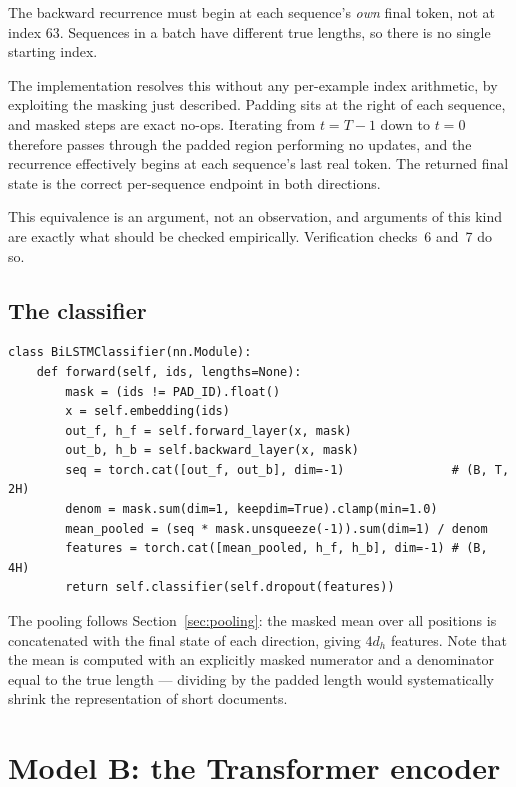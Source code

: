  The backward recurrence must begin
at each sequence's \emph{own} final token, not at index 63. Sequences in a batch have different
true lengths, so there is no single starting index.

The implementation resolves this without any per-example index arithmetic, by exploiting the
masking just described. Padding sits at the right of each sequence, and masked steps are exact
no-ops. Iterating from $t = T-1$ down to $t = 0$ therefore passes through the padded region
performing no updates, and the recurrence effectively begins at each sequence's last real token.
The returned final state is the correct per-sequence endpoint in both directions.

This equivalence is an argument, not an observation, and arguments of this kind are exactly what
should be checked empirically. Verification checks~6 and~7 do so.

\subsection{The classifier}

{\small
\begin{verbatim}
class BiLSTMClassifier(nn.Module):
    def forward(self, ids, lengths=None):
        mask = (ids != PAD_ID).float()
        x = self.embedding(ids)
        out_f, h_f = self.forward_layer(x, mask)
        out_b, h_b = self.backward_layer(x, mask)
        seq = torch.cat([out_f, out_b], dim=-1)               # (B, T, 2H)
        denom = mask.sum(dim=1, keepdim=True).clamp(min=1.0)
        mean_pooled = (seq * mask.unsqueeze(-1)).sum(dim=1) / denom
        features = torch.cat([mean_pooled, h_f, h_b], dim=-1) # (B, 4H)
        return self.classifier(self.dropout(features))
\end{verbatim}}

The pooling follows Section~\ref{sec:pooling}: the masked mean over all positions is concatenated
with the final state of each direction, giving $4 d_h$ features. Note that the mean is computed
with an explicitly masked numerator and a denominator equal to the true length --- dividing by the
padded length would systematically shrink the representation of short documents.

\section{Model B: the Transformer encoder}

